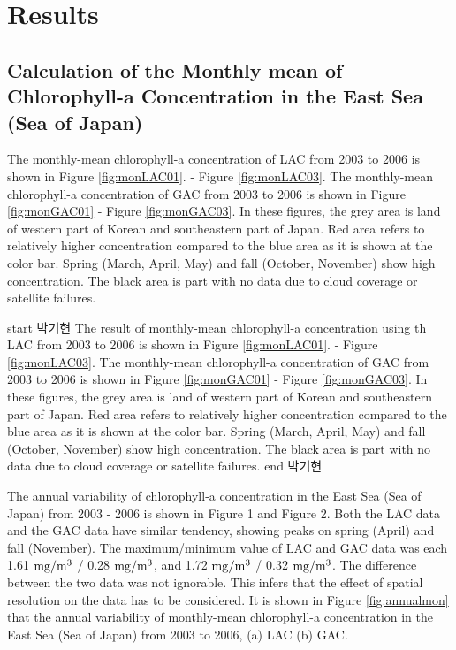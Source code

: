\section{Results}

\subsection{Calculation of the Monthly mean of Chlorophyll-a Concentration in the East Sea (Sea of Japan)}

The monthly-mean chlorophyll-a concentration of LAC from 2003 to 2006 is shown in Figure \ref{fig:monLAC01}. - Figure \ref{fig:monLAC03}. The monthly-mean chlorophyll-a concentration of GAC from 2003 to 2006 is shown in Figure \ref{fig:monGAC01} - Figure \ref{fig:monGAC03}. In these figures, the grey area is land of western part of Korean and southeastern part of Japan. Red area refers to relatively higher concentration compared to the blue area as it is shown at the color bar. Spring (March, April, May) and fall (October, November) show high concentration. The black area is part with no data due to cloud coverage or satellite failures. 

start 박기현
The result of monthly-mean chlorophyll-a concentration using th  LAC from 2003 to 2006 is shown in Figure \ref{fig:monLAC01}. - Figure \ref{fig:monLAC03}. The monthly-mean chlorophyll-a concentration of GAC from 2003 to 2006 is shown in Figure \ref{fig:monGAC01} - Figure \ref{fig:monGAC03}. In these figures, the grey area is land of western part of Korean and southeastern part of Japan. Red area refers to relatively higher concentration compared to the blue area as it is shown at the color bar. Spring (March, April, May) and fall (October, November) show high concentration. The black area is part with no data due to cloud coverage or satellite failures. 
end 박기현


The annual variability of chlorophyll-a concentration in the East Sea (Sea of Japan) from 2003 - 2006 is shown in Figure 1 and Figure 2. Both the LAC data and the GAC data have similar tendency, showing peaks on spring (April) and fall (November). The maximum/minimum value of LAC and GAC data was each 1.61 $\rm mg/m^3$ / 0.28 $\rm mg/m^3$, and 1.72 $\rm mg/m^3$ / 0.32 $\rm mg/m^3$. The difference between the two data was not ignorable. This infers that the effect of spatial resolution on the data has to be considered.
It is shown in Figure \ref{fig:annualmon} that the annual variability of monthly-mean chlorophyll-a concentration in the East Sea (Sea of Japan) from 2003 to 2006, (a) LAC (b) GAC.



